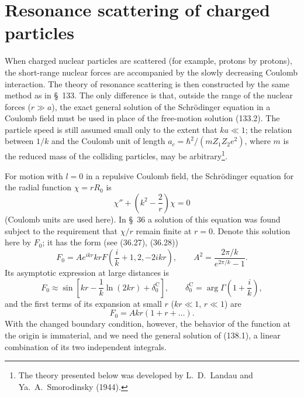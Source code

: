 \section{Resonance scattering of charged particles}

When charged nuclear particles are scattered (for example, protons by
protons), the short-range nuclear forces are accompanied by the slowly
decreasing Coulomb interaction. The theory of resonance scattering is then
constructed by the same method as in \S~133. The only difference is that,
outside the range of the nuclear forces ($r\gg a$), the exact general solution
of the Schrödinger equation in a Coulomb field must be used in place of the
free-motion solution (133.2). The particle speed is still assumed small only
to the extent that $ka\ll1$; the relation between $1/k$ and the Coulomb unit
of length $a_c=\hbar^2/(mZ_1Z_2e^2)$, where $m$ is the reduced mass of the
colliding particles, may be arbitrary\footnote{The theory presented below was
developed by L.~D.~Landau and Ya.~A.~Smorodinsky (1944).}.

For motion with $l=0$ in a repulsive Coulomb field, the Schrödinger equation
for the radial function $\chi=rR_0$ is
\begin{equation}
 \chi''+\left(k^2-\frac2r\right)\chi=0
 \tag{138.1}
\end{equation}
(Coulomb units are used here). In \S~36 a solution of this equation was found
subject to the requirement that $\chi/r$ remain finite at $r=0$. Denote this
solution here by $F_0$; it has the form (see (36.27), (36.28))
\begin{equation}
 F_0=Ae^{ikr}krF\left(\frac{i}{k}+1,2,-2ikr\right),\qquad
 A^2=\frac{2\pi/k}{e^{2\pi/k}-1}.
 \tag{138.2}
\end{equation}
Its asymptotic expression at large distances is
\begin{equation}
 F_0\approx\sin\left[kr-\frac1k\ln(2kr)+\delta_0^{\mathrm C}\right],\qquad
 \delta_0^{\mathrm C}=\arg\Gamma\left(1+\frac{i}{k}\right),
 \tag{138.3}
\end{equation}
and the first terms of its expansion at small $r$ ($kr\ll1$, $r\ll1$) are
\begin{equation}
 F_0=Akr(1+r+\ldots).
 \tag{138.4}
\end{equation}
With the changed boundary condition, however, the behavior of the function at
the origin is immaterial, and we need the general solution of (138.1), a
linear combination of its two independent integrals.


